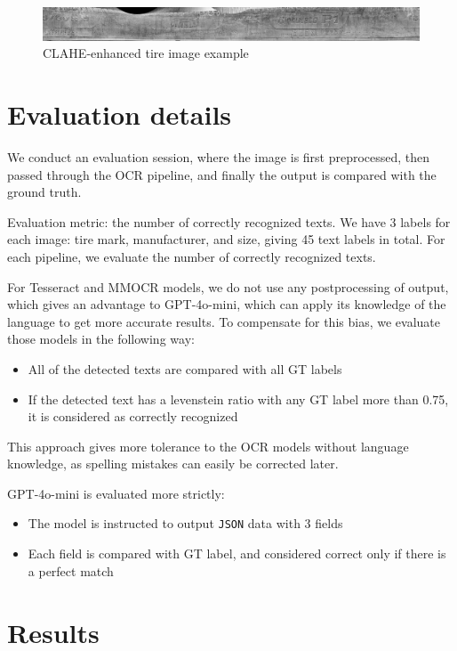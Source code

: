 \documentclass{article}
\begin{document}
\begin{figure}[H]
    \centering
    \includegraphics[width=1.\textwidth]{assets/clahe_example.png}
    \caption{CLAHE-enhanced tire image example}
    \label{fig:clahe_example}
\end{figure}

\section{Evaluation details}

We conduct an evaluation session, where the image is first preprocessed, then passed through the OCR pipeline, and finally the output is compared with the ground truth.

Evaluation metric: the number of correctly recognized texts. We have 3 labels for each image: tire mark, manufacturer, and size, giving 45 text labels in total. For each pipeline, we evaluate the number of correctly recognized texts.

For Tesseract and MMOCR models, we do not use any postprocessing of output, which gives an advantage to GPT-4o-mini, which can apply its knowledge of the language to get more accurate results. To compensate for this bias, we evaluate those models in the following way:

\begin{itemize}
    \item All of the detected texts are compared with all GT labels
    \item If the detected text has a levenstein ratio with any GT label more than 0.75, it is considered as correctly recognized
\end{itemize}

This approach gives more tolerance to the OCR models without language knowledge, as spelling mistakes can easily be corrected later.

GPT-4o-mini is evaluated more strictly:
\begin{itemize}
    \item The model is instructed to output \texttt{JSON} data with 3 fields
    \item Each field is compared with GT label, and considered correct only if there is a perfect match
\end{itemize}

\section{Results}
\end{document}
